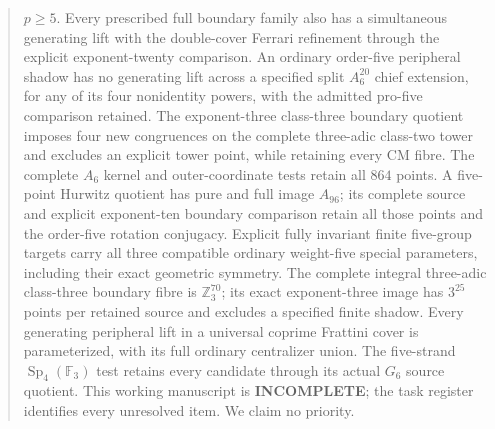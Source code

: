 \documentclass[11pt,a4paper]{article}
\begin{document}
\begin{abstract}
$p\ge5$. Every prescribed full boundary family also has a simultaneous generating lift with the double-cover Ferrari refinement through the explicit exponent-twenty comparison. An ordinary order-five peripheral shadow has no generating lift across a specified split $A_6^{20}$ chief extension, for any of its four nonidentity powers, with the admitted pro-five comparison retained. The exponent-three class-three boundary quotient imposes four new congruences on the complete three-adic class-two tower and excludes an explicit tower point, while retaining every CM fibre. The complete $A_6$ kernel and outer-coordinate tests retain all $864$ points. A five-point Hurwitz quotient has pure and full image $A_{96}$; its complete source and explicit exponent-ten boundary comparison retain all those points and the order-five rotation conjugacy. Explicit fully invariant finite five-group targets carry all three compatible ordinary weight-five special parameters, including their exact geometric symmetry. The complete integral three-adic class-three boundary fibre is $\mathbb Z_3^{70}$; its exact exponent-three image has $3^{25}$ points per retained source and excludes a specified finite shadow. Every generating peripheral lift in a universal coprime Frattini cover is parameterized, with its full ordinary centralizer union. The five-strand $\operatorname{Sp}_4(\mathbb F_3)$ test retains every candidate through its actual $G_6$ source quotient. This working manuscript is \textbf{INCOMPLETE}; the task register identifies every unresolved item. We claim no priority.
\end{abstract}
\tableofcontents
\end{document}
